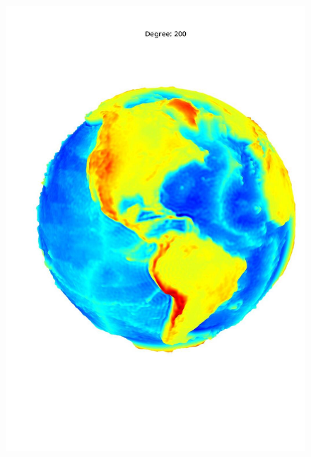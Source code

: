 \documentclass[a4paper]{article}
\theoremstyle{definition}
\begin{document}
\begin{figure}[h!]
\begin{minipage}{.245\textwidth}
        \includegraphics[width=0.95\linewidth]{media/med_200.jpg}
        \label{fig:med200}
    \end{minipage}
    \begin{minipage}{.245\textwidth}
        \centering

\end{minipage}
\end{figure}
\end{document}
